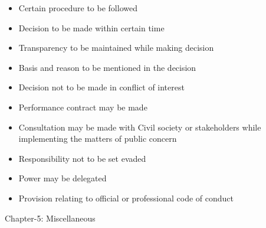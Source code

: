 \documentclass[
  openany]{book}
\providecommand{\tightlist}{%
  \setlength{\itemsep}{0pt}\setlength{\parskip}{0pt}}
\begin{document}
\begin{itemize}
\tightlist
\item
  Certain procedure to be followed
\item
  Decision to be made within certain time
\item
  Transparency to be maintained while making decision
\item
  Basis and reason to be mentioned in the decision
\item
  Decision not to be made in conflict of interest
\item
  Performance contract may be made
\item
  Consultation may be made with Civil society or stakeholders while implementing the matters of public concern
\item
  Responsibility not to be set evaded
\item
  Power may be delegated
\item
  Provision relating to official or professional code of conduct
\end{itemize}

Chapter-5: Miscellaneous
\end{document}
